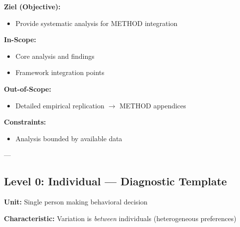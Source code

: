 \begin{abstract}
This appendix provides systematic analysis and documentation relevant to the
Evidence-Based Framework (EBF). It integrates with the 10C CORE architecture
and provides validated findings for practical application.
\end{abstract}

\begin{tcolorbox}[
    colback=orange!5!white,
    colframe=orange!75!black,
    title={\textbf{Appendix Scope: Ziel / In-Scope / Out-of-Scope / Constraints}},
    fonttitle=\bfseries
]

\textbf{Ziel (Objective):}
\begin{itemize}[nosep]
    \item Provide systematic analysis for METHOD integration
\end{itemize}

\textbf{In-Scope:}
\begin{itemize}[nosep]
    \item Core analysis and findings
    \item Framework integration points
\end{itemize}

\textbf{Out-of-Scope:}
\begin{itemize}[nosep]
    \item Detailed empirical replication $\rightarrow$ METHOD appendices
\end{itemize}

\textbf{Constraints:}
\begin{itemize}[nosep]
    \item Analysis bounded by available data
\end{itemize}

\end{tcolorbox}

---


\subsection*{Level 0: Individual --- Diagnostic Template}

\textbf{Unit:} Single person making behavioral decision

\textbf{Characteristic:} Variation is \emph{between} individuals (heterogeneous preferences)


